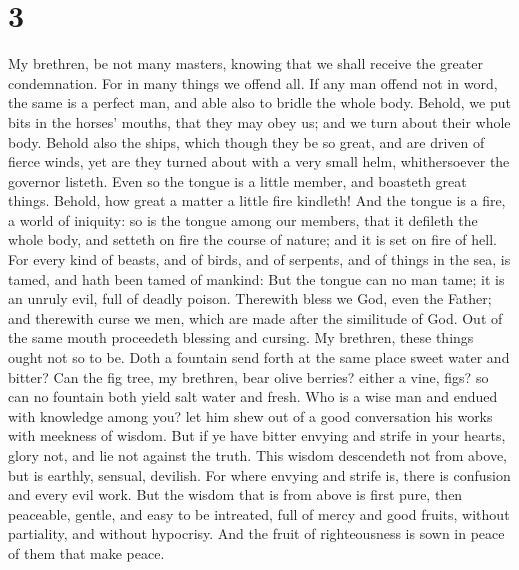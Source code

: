 \hypertarget{section-2}{%
\section{3}\label{section-2}}

 My brethren, be not many masters, knowing that we shall
receive the greater condemnation.  For in many things we
offend all. If any man offend not in word, the same is a perfect man,
and able also to bridle the whole body.  Behold, we put
bits in the horses' mouths, that they may obey us; and we turn about
their whole body.  Behold also the ships, which though
they be so great, and are driven of fierce winds, yet are they turned
about with a very small helm, whithersoever the governor listeth.
 Even so the tongue is a little member, and boasteth great
things. Behold, how great a matter a little fire kindleth!
 And the tongue is a fire, a world of iniquity: so is the
tongue among our members, that it defileth the whole body, and setteth
on fire the course of nature; and it is set on fire of hell.
 For every kind of beasts, and of birds, and of serpents,
and of things in the sea, is tamed, and hath been tamed of mankind:
 But the tongue can no man tame; it is an unruly evil,
full of deadly poison.  Therewith bless we God, even the
Father; and therewith curse we men, which are made after the similitude
of God.  Out of the same mouth proceedeth blessing and
cursing. My brethren, these things ought not so to be. 
Doth a fountain send forth at the same place sweet water and bitter?
 Can the fig tree, my brethren, bear olive berries?
either a vine, figs? so can no fountain both yield salt water and fresh.
 Who is a wise man and endued with knowledge among you?
let him shew out of a good conversation his works with meekness of
wisdom.  But if ye have bitter envying and strife in your
hearts, glory not, and lie not against the truth.  This
wisdom descendeth not from above, but is earthly, sensual, devilish.
 For where envying and strife is, there is confusion and
every evil work.  But the wisdom that is from above is
first pure, then peaceable, gentle, and easy to be intreated, full of
mercy and good fruits, without partiality, and without hypocrisy.
 And the fruit of righteousness is sown in peace of them
that make peace.


